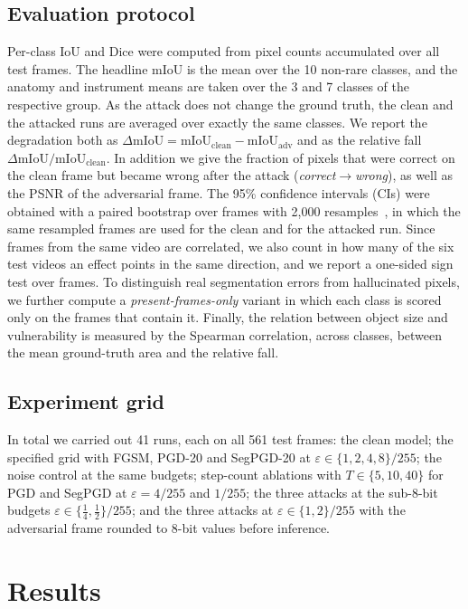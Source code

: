 \documentclass[conference]{IEEEtran}
\newcommand{\eps}{\varepsilon}
\begin{document}
\subsection{Evaluation protocol}
Per-class IoU and Dice were computed from pixel counts accumulated over all test frames. The headline mIoU is the mean over the 10 non-rare classes, and the anatomy and instrument means are taken over the 3 and 7 classes of the respective group. As the attack does not change the ground truth, the clean and the attacked runs are averaged over exactly the same classes. We report the degradation both as $\Delta\mathrm{mIoU}=\mathrm{mIoU}_{\text{clean}}-\mathrm{mIoU}_{\text{adv}}$ and as the relative fall $\Delta\mathrm{mIoU}/\mathrm{mIoU}_{\text{clean}}$. In addition we give the fraction of pixels that were correct on the clean frame but became wrong after the attack (\emph{correct$\to$wrong}), as well as the PSNR of the adversarial frame. The 95\% confidence intervals (CIs) were obtained with a paired bootstrap over frames with 2,000 resamples~\cite{efron1993bootstrap}, in which the same resampled frames are used for the clean and for the attacked run. Since frames from the same video are correlated, we also count in how many of the six test videos an effect points in the same direction, and we report a one-sided sign test over frames. To distinguish real segmentation errors from hallucinated pixels, we further compute a \emph{present-frames-only} variant in which each class is scored only on the frames that contain it. Finally, the relation between object size and vulnerability is measured by the Spearman correlation, across classes, between the mean ground-truth area and the relative fall.

\subsection{Experiment grid}
In total we carried out 41 runs, each on all 561 test frames: the clean model; the specified grid with FGSM, PGD-20 and SegPGD-20 at $\eps\in\{1,2,4,8\}/255$; the noise control at the same budgets; step-count ablations with $T\in\{5,10,40\}$ for PGD and SegPGD at $\eps=4/255$ and $1/255$; the three attacks at the sub-8-bit budgets $\eps\in\{\frac14,\frac12\}/255$; and the three attacks at $\eps\in\{1,2\}/255$ with the adversarial frame rounded to 8-bit values before inference.

\section{Results}
\end{document}
